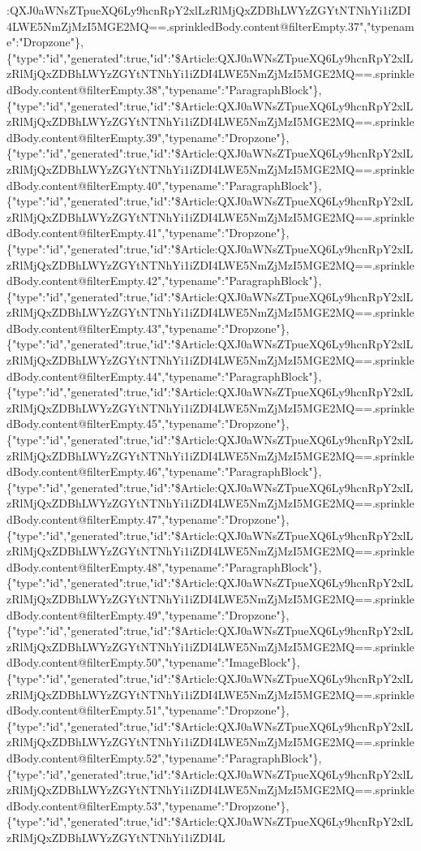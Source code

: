 :QXJ0aWNsZTpueXQ6Ly9hcnRpY2xlLzRlMjQxZDBhLWYzZGYtNTNhYi1iZDI4LWE5NmZjMzI5MGE2MQ==.sprinkledBody.content@filterEmpty.37","typename":"Dropzone"\},\{"type":"id","generated":true,"id":"\$Article:QXJ0aWNsZTpueXQ6Ly9hcnRpY2xlLzRlMjQxZDBhLWYzZGYtNTNhYi1iZDI4LWE5NmZjMzI5MGE2MQ==.sprinkledBody.content@filterEmpty.38","typename":"ParagraphBlock"\},\{"type":"id","generated":true,"id":"\$Article:QXJ0aWNsZTpueXQ6Ly9hcnRpY2xlLzRlMjQxZDBhLWYzZGYtNTNhYi1iZDI4LWE5NmZjMzI5MGE2MQ==.sprinkledBody.content@filterEmpty.39","typename":"Dropzone"\},\{"type":"id","generated":true,"id":"\$Article:QXJ0aWNsZTpueXQ6Ly9hcnRpY2xlLzRlMjQxZDBhLWYzZGYtNTNhYi1iZDI4LWE5NmZjMzI5MGE2MQ==.sprinkledBody.content@filterEmpty.40","typename":"ParagraphBlock"\},\{"type":"id","generated":true,"id":"\$Article:QXJ0aWNsZTpueXQ6Ly9hcnRpY2xlLzRlMjQxZDBhLWYzZGYtNTNhYi1iZDI4LWE5NmZjMzI5MGE2MQ==.sprinkledBody.content@filterEmpty.41","typename":"Dropzone"\},\{"type":"id","generated":true,"id":"\$Article:QXJ0aWNsZTpueXQ6Ly9hcnRpY2xlLzRlMjQxZDBhLWYzZGYtNTNhYi1iZDI4LWE5NmZjMzI5MGE2MQ==.sprinkledBody.content@filterEmpty.42","typename":"ParagraphBlock"\},\{"type":"id","generated":true,"id":"\$Article:QXJ0aWNsZTpueXQ6Ly9hcnRpY2xlLzRlMjQxZDBhLWYzZGYtNTNhYi1iZDI4LWE5NmZjMzI5MGE2MQ==.sprinkledBody.content@filterEmpty.43","typename":"Dropzone"\},\{"type":"id","generated":true,"id":"\$Article:QXJ0aWNsZTpueXQ6Ly9hcnRpY2xlLzRlMjQxZDBhLWYzZGYtNTNhYi1iZDI4LWE5NmZjMzI5MGE2MQ==.sprinkledBody.content@filterEmpty.44","typename":"ParagraphBlock"\},\{"type":"id","generated":true,"id":"\$Article:QXJ0aWNsZTpueXQ6Ly9hcnRpY2xlLzRlMjQxZDBhLWYzZGYtNTNhYi1iZDI4LWE5NmZjMzI5MGE2MQ==.sprinkledBody.content@filterEmpty.45","typename":"Dropzone"\},\{"type":"id","generated":true,"id":"\$Article:QXJ0aWNsZTpueXQ6Ly9hcnRpY2xlLzRlMjQxZDBhLWYzZGYtNTNhYi1iZDI4LWE5NmZjMzI5MGE2MQ==.sprinkledBody.content@filterEmpty.46","typename":"ParagraphBlock"\},\{"type":"id","generated":true,"id":"\$Article:QXJ0aWNsZTpueXQ6Ly9hcnRpY2xlLzRlMjQxZDBhLWYzZGYtNTNhYi1iZDI4LWE5NmZjMzI5MGE2MQ==.sprinkledBody.content@filterEmpty.47","typename":"Dropzone"\},\{"type":"id","generated":true,"id":"\$Article:QXJ0aWNsZTpueXQ6Ly9hcnRpY2xlLzRlMjQxZDBhLWYzZGYtNTNhYi1iZDI4LWE5NmZjMzI5MGE2MQ==.sprinkledBody.content@filterEmpty.48","typename":"ParagraphBlock"\},\{"type":"id","generated":true,"id":"\$Article:QXJ0aWNsZTpueXQ6Ly9hcnRpY2xlLzRlMjQxZDBhLWYzZGYtNTNhYi1iZDI4LWE5NmZjMzI5MGE2MQ==.sprinkledBody.content@filterEmpty.49","typename":"Dropzone"\},\{"type":"id","generated":true,"id":"\$Article:QXJ0aWNsZTpueXQ6Ly9hcnRpY2xlLzRlMjQxZDBhLWYzZGYtNTNhYi1iZDI4LWE5NmZjMzI5MGE2MQ==.sprinkledBody.content@filterEmpty.50","typename":"ImageBlock"\},\{"type":"id","generated":true,"id":"\$Article:QXJ0aWNsZTpueXQ6Ly9hcnRpY2xlLzRlMjQxZDBhLWYzZGYtNTNhYi1iZDI4LWE5NmZjMzI5MGE2MQ==.sprinkledBody.content@filterEmpty.51","typename":"Dropzone"\},\{"type":"id","generated":true,"id":"\$Article:QXJ0aWNsZTpueXQ6Ly9hcnRpY2xlLzRlMjQxZDBhLWYzZGYtNTNhYi1iZDI4LWE5NmZjMzI5MGE2MQ==.sprinkledBody.content@filterEmpty.52","typename":"ParagraphBlock"\},\{"type":"id","generated":true,"id":"\$Article:QXJ0aWNsZTpueXQ6Ly9hcnRpY2xlLzRlMjQxZDBhLWYzZGYtNTNhYi1iZDI4LWE5NmZjMzI5MGE2MQ==.sprinkledBody.content@filterEmpty.53","typename":"Dropzone"\},\{"type":"id","generated":true,"id":"\$Article:QXJ0aWNsZTpueXQ6Ly9hcnRpY2xlLzRlMjQxZDBhLWYzZGYtNTNhYi1iZDI4L